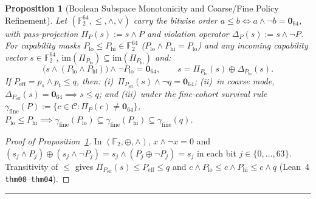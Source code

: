 \documentclass[10pt,twocolumn]{article}
\makeatletter
\newif\ifspecintwocol \specintwocolfalse
\newif\ifspecresume   \specresumefalse
\newcommand{\StartTwoCol}{%
  \if@twocolumn
    \let\spec@next\@empty
  \else
    \ifspecintwocol
      \let\spec@next\@empty
    \else
      \global\specintwocoltrue
      \def\spec@next{\begin{multicols}{2}}%
    \fi
  \fi
  \spec@next
}
\newcommand{\EndConnesPlate}{%
  \par\vspace{3pt}\noindent\textcolor{black!25}{\rule{\textwidth}{0.4pt}}\par\vspace{4pt}%
  \ifspecresume
    \global\specresumefalse
    \let\spec@platepost\StartTwoCol
  \else
    \let\spec@platepost\@empty
  \fi
  \spec@platepost
}
\theoremstyle{spectralthm}
\newtheorem{proposition}[theorem]{Proposition}
\makeatother
\begin{document}
\begin{proposition}[Boolean Subspace Monotonicity and Coarse/Fine Policy Refinement]
\label{prop:monotonic}
Let $(\mathbb{F}_2^{64}, \le, \wedge, \vee)$ carry the bitwise order $a \le b \iff a \wedge \neg b = \mathbf{0}_{64}$, with pass-projection $\Pi_P(s) := s \wedge P$ and violation operator $\Delta_P(s) := s \wedge \neg P$. For capability masks $P_{\mathrm{lo}} \le P_{\mathrm{hi}} \in \mathbb{F}_2^{64}$ ($P_{\mathrm{lo}} \wedge P_{\mathrm{hi}} = P_{\mathrm{lo}}$) and any incoming capability vector $s \in \mathbb{F}_2^{64}$, $\mathrm{im}(\Pi_{P_{\mathrm{lo}}}) \subseteq \mathrm{im}(\Pi_{P_{\mathrm{hi}}})$ and:
\begin{equation}
\label{eq:monotonic}
\bigl(s \wedge (P_{\mathrm{lo}} \wedge P_{\mathrm{hi}})\bigr) \wedge \neg P_{\mathrm{lo}} = \mathbf{0}_{64},\qquad
s = \Pi_{P_{\mathrm{lo}}}(s) \oplus \Delta_{P_{\mathrm{lo}}}(s).
\end{equation}
If $P_{\mathrm{eff}} = p_s \wedge p_t \le q$, then: (i)~$\Pi_{P_{\mathrm{eff}}}(s) \wedge \neg q = \mathbf{0}_{64}$; (ii)~in coarse mode, $\Delta_{P_{\mathrm{eff}}}(s) = \mathbf{0}_{64} \implies s \le q$; and (iii)~under the fine-cohort survival rule $\gamma_{\mathrm{fine}}(P) := \{c \in \mathcal{C} : \Pi_P(c) \neq \mathbf{0}_{64}\}$, $P_{\mathrm{lo}} \le P_{\mathrm{hi}} \implies \gamma_{\mathrm{fine}}(P_{\mathrm{lo}}) \subseteq \gamma_{\mathrm{fine}}(P_{\mathrm{hi}}) \subseteq \gamma_{\mathrm{fine}}(q)$.
\end{proposition}
\begin{proof}[Proof of Proposition~\ref{prop:monotonic}]
In $(\mathbb{F}_2, \oplus, \wedge)$, $x \wedge \neg x = 0$ and $(s_j \wedge P_j) \oplus (s_j \wedge \neg P_j) = s_j \wedge (P_j \oplus \neg P_j) = s_j$ in each bit $j \in \{0,\ldots,63\}$. Transitivity of $\le$ gives $\Pi_{P_{\mathrm{eff}}}(s) \le P_{\mathrm{eff}} \le q$ and $c \wedge P_{\mathrm{lo}} \le c \wedge P_{\mathrm{hi}} \le c \wedge q$ (Lean~4 \texttt{thm00}--\texttt{thm04}).
\end{proof}
\EndConnesPlate
\end{document}

